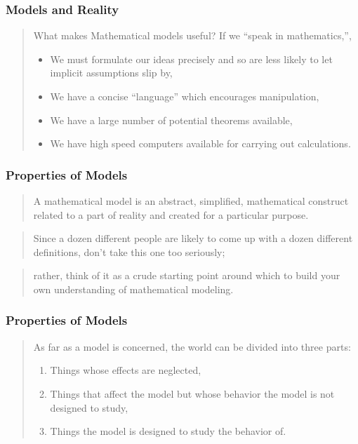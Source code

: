 \begin{frame}
    \frametitle{Models and Reality}
    \begin{verse}
    What makes Mathematical models useful? 
    If we ``speak in mathematics,'', 
    \begin{itemize}
        \item We must formulate our ideas precisely and so are less likely to
            let implicit assumptions slip by,
        \item We have a concise ``language'' which encourages manipulation,
        \item We have a large number of potential theorems available,
        \item We have high speed computers available for carrying out calculations.
    \end{itemize}
    \end{verse}
\end{frame}

\begin{frame}
    \frametitle{Properties of Models}
    \begin{verse}
        A mathematical model is an abstract, simplified, mathematical
        construct related to a part of reality and created for a particular
        purpose.
    \end{verse} 
    \begin{verse} 
        Since a dozen different people are likely to come up with a
        dozen different definitions, don't take this one too seriously;
    \end{verse}
    \begin{verse}
        rather, think of it as a crude starting point around which to build
        your own understanding of mathematical modeling.
    \end{verse}
\end{frame}

\begin{frame}
    \frametitle{Properties of Models}
    \begin{verse}
    As far as a model is concerned, the world can be divided into three parts:
    \begin{enumerate}
        \item Things whose effects are neglected,
        \item Things that affect the model but whose behavior the model is not
            designed to study,
        \item Things the model is designed to study the behavior of. 
    \end{enumerate}
\end{verse}
\end{frame}

